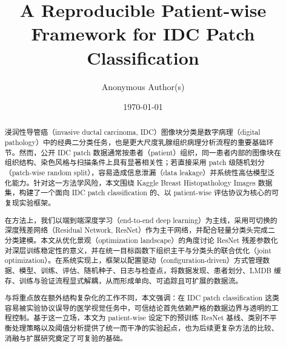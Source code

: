\documentclass[12pt]{article}
\title{A Reproducible Patient-wise Framework for IDC Patch Classification}
\author{Anonymous Author(s)}
\date{\today}
\begin{document}
\maketitle

\begin{abstract}
    浸润性导管癌（invasive ductal carcinoma, IDC）图像块分类是数字病理（digital pathology）中的经典二分类任务，也是更大尺度乳腺组织病理分析流程的重要基础环节。然而，公开 IDC patch 数据通常按患者（patient）组织，同一患者内部的图像块在组织结构、染色风格与扫描条件上具有显著相关性；若直接采用 patch 级随机划分（patch-wise random split），容易造成信息泄漏（data leakage）并系统性高估模型泛化能力。针对这一方法学风险，本文围绕 Kaggle Breast Histopathology Images 数据集，构建了一个面向 IDC patch classification 的、以 patient-wise 评估协议为核心的可复现实验框架。

    在方法上，我们以端到端深度学习（end-to-end deep learning）为主线，采用可切换的深度残差网络（Residual Network, ResNet）作为主干网络，并配合轻量分类头完成二分类建模。本文从优化景观（optimization landscape）的角度讨论 ResNet 残差参数化对深层训练稳定性的意义，并在统一目标函数下组织主干与分类头的联合优化（joint optimization）。在系统实现上，框架以配置驱动（configuration-driven）方式管理数据、模型、训练、评估、随机种子、日志与检查点，将数据发现、患者划分、LMDB 缓存、训练与验证流程显式解耦，从而形成单向、可追踪且可扩展的数据流。

    与将重点放在额外结构复杂化的工作不同，本文强调：在 IDC patch classification 这类容易被实验协议误导的医学视觉任务中，可信结论首先依赖严格的数据边界与透明的工程控制。基于这一立场，本文为 patient-wise 设定下的预训练 ResNet 基线、类别不平衡处理策略以及阈值分析提供了统一而干净的实验起点，也为后续更复杂方法的比较、消融与扩展研究奠定了可复验的基础。
\end{abstract}
\newpage

















\printbibliography[title={References}]
\end{document}
